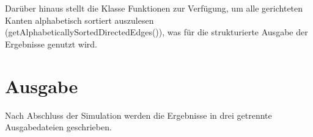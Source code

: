 \begin{figure}[h!]
    \centering
\end{figure}






Darüber hinaus stellt die Klasse Funktionen zur Verfügung,
um alle gerichteten Kanten alphabetisch sortiert auszulesen (getAlphabeticallySortedDirectedEdges()),
was für die strukturierte Ausgabe der Ergebnisse genutzt wird.

\cleardoublepage

\section{Ausgabe}

Nach Abschluss der Simulation werden die Ergebnisse in drei getrennte Ausgabedateien geschrieben.

